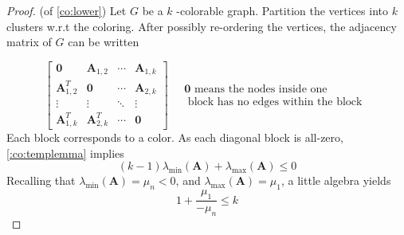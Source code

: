 \documentclass{article}
\begin{document}
\begin{proof}(of \cref{co:lower})
Let $G$ be a $k$ -colorable graph. Partition the vertices into $k$ clusters w.r.t the coloring. After possibly re-ordering the vertices, the adjacency matrix of $G$ can be written

$$
\left[\begin{array}{cccc}
\mathbf{0} & \boldsymbol{A}_{1,2} & \cdots & \boldsymbol{A}_{1, k} \\
\boldsymbol{A}_{1,2}^{T} & \mathbf{0} & \cdots & \boldsymbol{A}_{2, k} \\
\vdots & \vdots & \ddots & \vdots \\
\boldsymbol{A}_{1, k}^{T} & \boldsymbol{A}_{2, k}^{T} & \cdots & \mathbf{0}
\end{array}\right] \quad \begin{array}{l}
\mathbf{0} \text { means the nodes inside one } \\
\text { block has no edges within the block }
\end{array}
$$
Each block corresponds to a color.
As each diagonal block is all-zero,\cref{:co:templemma} implies
$$
(k-1) \lambda_{\min }(\boldsymbol{A})+\lambda_{\max }(\boldsymbol{A}) \leq 0
$$
Recalling that $\lambda_{\min }(\boldsymbol{A})=\mu_{n}<0$, and $\lambda_{\max }(\boldsymbol{A})=\mu_{1}$, a little algebra yields
$$
1+\frac{\mu_{1}}{-\mu_{n}} \leq k
$$
\end{proof} 
\end{document}
